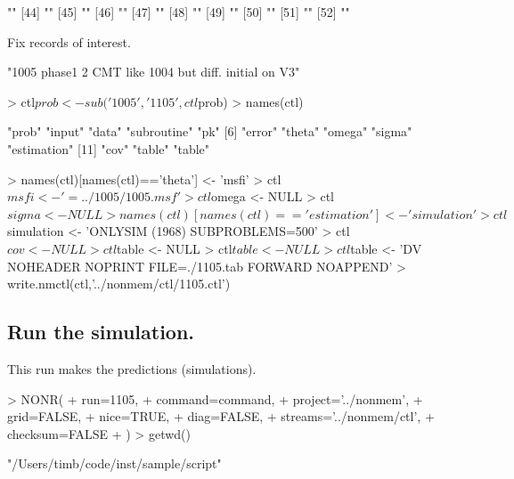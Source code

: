 \begin{Schunk}
\begin{Soutput}
[43] ""                                                                                            
[44] ""                                                                                            
[45] ""                                                                                            
[46] ""                                                                                            
[47] ""                                                                                            
[48] ""                                                                                            
[49] ""                                                                                            
[50] ""                                                                                            
[51] ""                                                                                            
[52] ""                                                                                            
\end{Soutput}
\end{Schunk}
Fix records of interest.
\begin{Schunk}
\begin{Soutput}
[1] "1005 phase1 2 CMT like 1004 but diff. initial on V3"
\end{Soutput}
\begin{Sinput}
> ctl$prob <- sub('1005','1105',ctl$prob)
> names(ctl)
\end{Sinput}
\begin{Soutput}
 [1] "prob"       "input"      "data"       "subroutine" "pk"        
 [6] "error"      "theta"      "omega"      "sigma"      "estimation"
[11] "cov"        "table"      "table"     
\end{Soutput}
\begin{Sinput}
> names(ctl)[names(ctl)=='theta'] <- 'msfi'
> ctl$msfi <- '=../1005/1005.msf'
> ctl$omega <- NULL
> ctl$sigma <- NULL
> names(ctl)[names(ctl)=='estimation'] <- 'simulation'
> ctl$simulation <- 'ONLYSIM (1968) SUBPROBLEMS=500'
> ctl$cov <- NULL
> ctl$table <- NULL
> ctl$table <- NULL
> ctl$table <- 'DV NOHEADER NOPRINT FILE=./1105.tab FORWARD NOAPPEND'
> write.nmctl(ctl,'../nonmem/ctl/1105.ctl')
\end{Sinput}
\end{Schunk}
\subsection{Run the simulation.}
This run makes the predictions (simulations).
\begin{Schunk}
\begin{Sinput}
> NONR(
+      run=1105,
+      command=command,
+      project='../nonmem',
+      grid=FALSE,
+      nice=TRUE,
+      diag=FALSE,
+      streams='../nonmem/ctl',
+      checksum=FALSE
+ )
> getwd()
\end{Sinput}
\begin{Soutput}
[1] "/Users/timb/code/inst/sample/script"
\end{Soutput}
\end{Schunk}
